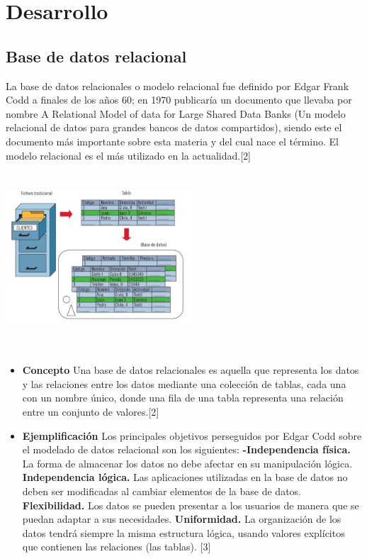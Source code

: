 \documentclass[twoside,twocolumn]{article}
\begin{document}
\section{Desarrollo}

\subsection{Base de datos relacional}
La base de datos relacionales o modelo relacional 
fue definido por Edgar Frank Codd a finales de los años
60; en 1970 publicaría un documento que llevaba por nombre
A Relational Model of data for Large Shared Data Banks 
(Un modelo relacional de datos para grandes bancos de datos compartidos), 
siendo este el documento más importante sobre esta materia y del cual nace el término. El modelo relacional es el más utilizado en la actualidad.[2]
\includegraphics[width=7cm, height=7cm]{img/base de datos relacional.png}
\begin{itemize}
\item  \textbf{Concepto }
Una base de datos relacionales es aquella que
representa los datos y las relaciones entre los
datos mediante una colección de tablas, cada una
con un nombre único, donde una fila de una tabla 
representa una relación entre un conjunto de valores.[2]
\item  \textbf{Ejemplificación}
Los principales objetivos perseguidos por 
Edgar Codd sobre el modelado de datos relacional son los siguientes: 
\textbf{-Independencia física.} La forma de almacenar los datos no debe afectar en su manipulación lógica.
\textbf{Independencia lógica.} Las aplicaciones utilizadas en la base de datos no deben ser modificadas al cambiar elementos de la base de datos. 
\textbf{Flexibilidad.} Los datos se pueden presentar a los usuarios de manera que se puedan adaptar a sus necesidades. 
\textbf{Uniformidad.} La organización de los datos tendrá siempre la misma estructura lógica, usando valores explícitos que contienen las relaciones (las tablas). [3]

\end{itemize}
\end{document}
